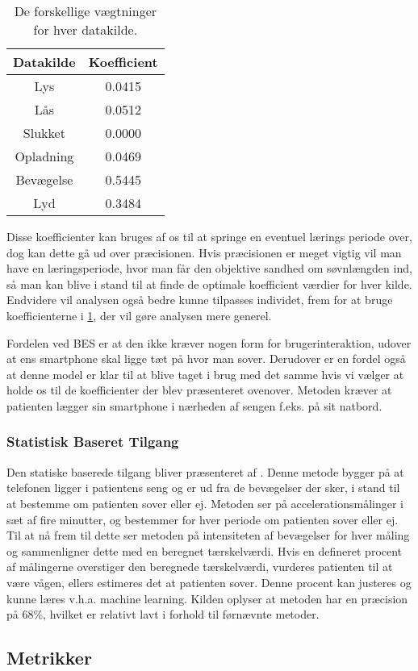 \begin{table}[h]
\centering
\begin{tabular}{|c|c|}
\hline Datakilde & Koefficient\\
\hline Lys & 0.0415 \\ 
\hline Lås & 0.0512 \\ 
\hline Slukket & 0.0000 \\ 
\hline Opladning & 0.0469 \\ 
\hline Bevægelse & 0.5445 \\ 
\hline Lyd & 0.3484 \\ 
\hline 
\end{tabular}
\caption{De forskellige vægtninger for hver datakilde.}
\label{tab:vaegtninger}
\end{table}

Disse koefficienter kan bruges af os til at springe en eventuel lærings periode over, dog kan dette gå ud over præcisionen. 
Hvis præcisionen er meget vigtig vil man have en læringsperiode, hvor man får den objektive sandhed om søvnlængden ind, så man kan blive i stand til at finde de optimale koefficient værdier for hver kilde.
Endvidere vil analysen også bedre kunne tilpasses individet, frem for at bruge koefficienterne i \cref{tab:vaegtninger}, der vil gøre analysen mere generel.

Fordelen ved BES er at den ikke kræver nogen form for brugerinteraktion, udover at ens smartphone skal ligge tæt på hvor man sover.
Derudover er en fordel også at denne model er klar til at blive taget i brug med det samme hvis vi vælger at holde os til de koefficienter der blev præsenteret ovenover.
Metoden kræver at patienten lægger sin smartphone i nærheden af sengen f.eks. på sit natbord.

\subsubsection{Statistisk Baseret Tilgang}\label{sec:statbased}
Den statiske baserede tilgang bliver præsenteret af \citet{misc:statbased}.
Denne metode bygger på at telefonen ligger i patientens seng og er ud fra de bevægelser der sker, i stand til at bestemme om patienten sover eller ej. 
Metoden ser på  accelerationsmålinger i sæt af fire minutter, og bestemmer for hver periode om patienten sover eller ej.
Til at nå frem til dette ser metoden på intensiteten af bevægelser for hver måling og sammenligner dette med en beregnet tærskelværdi.
Hvis en defineret procent af målingerne overstiger den beregnede tærskelværdi, vurderes patienten til at være vågen, ellers estimeres det at patienten sover.
Denne procent kan justeres og kunne læres v.h.a. machine learning.
Kilden oplyser at metoden har en præcision på 68\%, hvilket er relativt lavt i forhold til førnævnte metoder.

\subsection{Metrikker}
